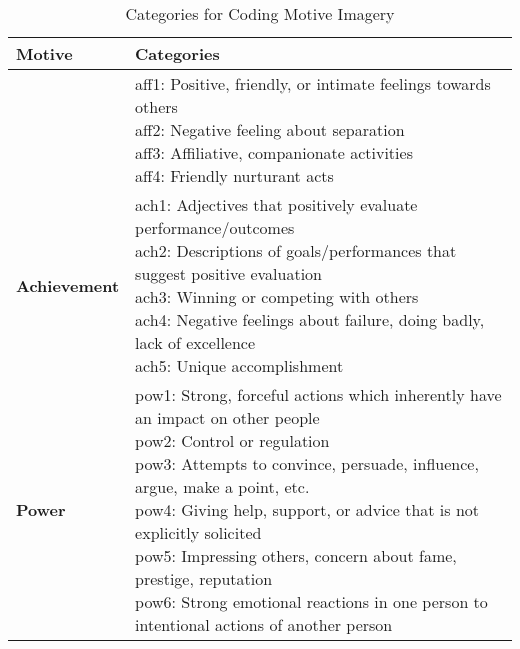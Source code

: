 \documentclass[man,a4paper,mask]{apa6}
\begin{document}
\begin{table*}
	\caption{Categories for Coding Motive Imagery \parencite{winter_MeasuringPersonalityDistance_1991,winter_ManualScoringMotive_1994}}
	\label{tab:wintercategories}
	\footnotesize
	\centering
	\begin{tabularx}{\textwidth}{lX}
		\toprule
        Motive & Categories \\
			\midrule
		  \adjustbox{valign=t}{\textbf{Affiliation/Intimacy}} & \makecell[l]{aff1: Positive, friendly, or intimate feelings towards others \\aff2: Negative feeling about separation \\aff3: Affiliative, companionate activities \\aff4: Friendly nurturant acts} \\

			\midrule
      \textbf{Achievement} & \makecell[l]{ach1: Adjectives that positively evaluate performance/outcomes \\ach2: Descriptions of goals/performances that suggest positive evaluation \\ach3: Winning or competing with others \\ach4: Negative feelings about failure, doing badly, lack of excellence \\ach5: Unique accomplishment} \\

			\midrule
      \textbf{Power} & \makecell[l]{pow1: Strong, forceful actions which inherently have an impact on other people \\pow2: Control or regulation \\pow3: Attempts to convince, persuade, influence, argue, make a point, etc. \\pow4: Giving help, support, or advice that is not explicitly solicited \\pow5: Impressing others, concern about fame, prestige, reputation \\pow6: Strong emotional reactions in one person to intentional actions of another person} \\
		\bottomrule
	\end{tabularx}
\end{table*}
\end{document}
